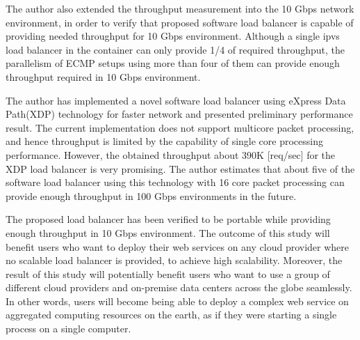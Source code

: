 The author also extended the throughput measurement into the 10 Gbps network environment, in order to verify that proposed software load balancer is capable of providing needed throughput for 10 Gbps environment.
Although a single ipvs load balancer in the container can only provide 1/4 of required throughput, the parallelism of ECMP setups using more than four of them can provide enough throughput required in 10 Gbps environment.

The author has implemented a novel software load balancer using eXpress Data Path(XDP) technology for faster network and presented preliminary performance result.
The current implementation does not support multicore packet processing, and hence throughput is limited by the capability of single core processing performance.
However, the obtained throughput about 390K [req/sec] for the XDP load balancer is very promising.
The author estimates that about five of the software load balancer using this technology with 16 core packet processing can provide enough throughput in 100  Gbps environments in the future. 

The proposed load balancer has been verified to be portable while providing enough throughput in 10 Gbps environment.
The outcome of this study will benefit users who want to deploy their web services on any cloud provider where no scalable load balancer is provided, to achieve high scalability.
Moreover, the result of this study will potentially benefit users who want to use a group of different cloud providers and on-premise data centers across the globe seamlessly.
In other words, users will become being able to deploy a complex web service on aggregated computing resources on the earth, as if they were starting a single process on a single computer.


